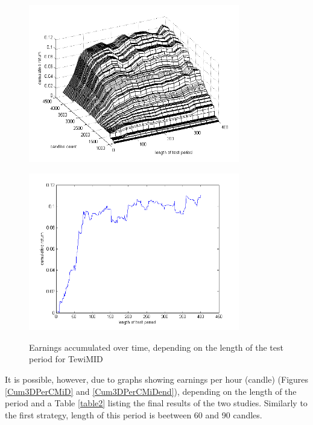 \documentclass{tewiart}
\begin{document}
\begin{figure}[h!]
\begin{minipage}{.459\linewidth}
\begin{center}
\includegraphics[width=0.82\textwidth]{pictures/cumulativeReturnsD.png}
\label{Cum3DMiD}
\end{center}
\end{minipage}
\begin{minipage}{.49\linewidth}
\begin{center}
\includegraphics[width=0.82\textwidth]{pictures/mid_end.png}
\label{Cum3DMiDend}
\end{center}
\end{minipage}
\caption{Earnings accumulated over time, depending on the length of the test period for TewiMID}
\end{figure}
\FloatBarrier

It is possible, however, due to graphs showing earnings per hour (candle) (Figures \ref{Cum3DPerCMiD} and \ref{Cum3DPerCMiDend}), depending on the length of the period and a Table \ref{table2} listing the final results of the two studies. Similarly to the first strategy, length of this period is beetween 60  and 90 candles.
\end{document}
